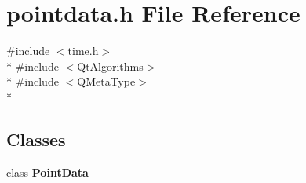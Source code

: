 \section{pointdata.\+h File Reference}
\label{curve_2pointdata_8h}
{\ttfamily \#include $<$time.\+h$>$}\\*
{\ttfamily \#include $<$Qt\+Algorithms$>$}\\*
{\ttfamily \#include $<$Q\+Meta\+Type$>$}\\*
\subsection*{Classes}
\begin{DoxyCompactItemize}
\item 
class {\bf Point\+Data}
\end{DoxyCompactItemize}
